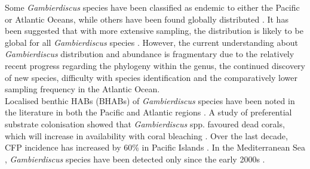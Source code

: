 \documentclass[12pt]{article}
\begin{document}
Some \emph{Gambierdiscus} species have been classified as endemic to either the Pacific or Atlantic Oceans, while others have been found globally distributed \cite{berdalet2012global,litaker2010global}. It has been suggested that with more extensive sampling, the distribution is likely to be global for all \emph{Gambierdiscus} species \cite{testerICHA}. However, the current understanding about \emph{Gambierdiscus} distribution and abundance is fragmentary due to the relatively recent progress regarding the phylogeny within the genus, the continued discovery of new species, difficulty with species identification and the comparatively lower sampling frequency in the Atlantic Ocean. \\
Localised benthic HABs (BHABs) of \emph{Gambierdiscus} species have been noted in the literature in both the Pacific and Atlantic regions \cite{nakajima1981toxicity,withers1984ciguatera,chinain1999seasonal,darius2007ciguatera}.
 A study of preferential substrate colonisation showed that \emph{Gambierdiscus} spp. favoured dead corals, which will increase in availability with coral bleaching \cite{grzebyk1994ecology}. Over the last decade, CFP incidence has increased by 60\% in Pacific Islands \cite{skinner2011ciguatera}. In the Mediterranean Sea \cite{lejeusne2010climate}, \emph{Gambierdiscus} species have been detected only since the early 2000s \cite{aligizaki2008morphological}. \\

\end{document}
